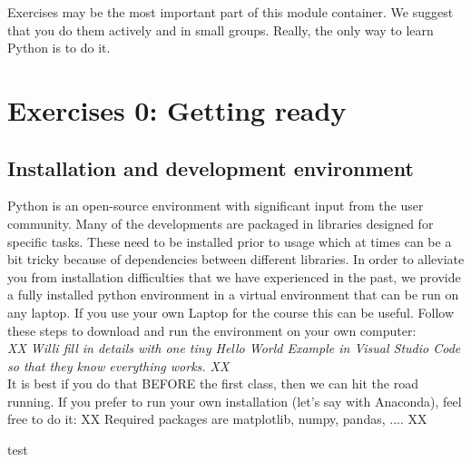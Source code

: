 \begin{tcolorbox}[enhanced jigsaw,breakable,pad at break*=1mm,
    colback=blue!5!white,colframe=babyblueeyes,title=Exercises]
    Exercises may be the most important part of this module container. We suggest that you do them actively and in small groups. Really, the only way to learn Python is to do it.      
\end{tcolorbox}
\section{Exercises 0: Getting ready}

\subsection{Installation and development environment}
Python is an open-source environment with significant input from the user community. Many of the developments are packaged in libraries designed for specific tasks. These need to be installed prior to usage which at times can be a bit tricky because of dependencies between different libraries. In order to alleviate you from installation difficulties that we have experienced in the past, we provide a fully installed python environment in a virtual environment that can be run on any laptop. If you use your own Laptop for the course this can be useful. Follow these steps to download and run the environment on your own computer:\\

\textit{XX Willi fill in details with one tiny Hello World Example in Visual Studio Code so that they know everything works. XX}\\

It is best if you do that BEFORE the first class, then we can hit the road running. If you prefer to run your own installation (let's say with Anaconda), feel free to do it: XX Required packages are matplotlib, numpy, pandas, .... XX


\ifanswers
    \begin{tcolorbox}[enhanced jigsaw,breakable,pad at break*=1mm,
    colback=blue!5!white,colframe=babyblueeyes,title=Solutions,
    watermark color=white]
    test 
    
    \end{tcolorbox}
\fi
